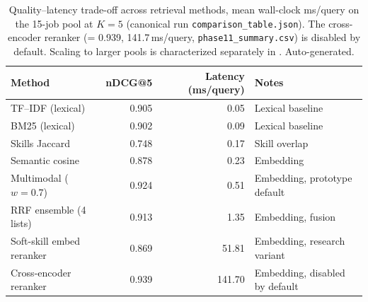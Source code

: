 \begin{table}[!t]
\centering
\caption{Quality--latency trade-off across retrieval methods, mean wall-clock ms/query on the 15-job pool at $K{=}5$ (canonical run \texttt{comparison\_table.json}). The cross-encoder reranker (\ndcg = 0.939, 141.7\,ms/query, \texttt{phase11\_summary.csv}) is disabled by default. Scaling to larger pools is characterized separately in . Auto-generated.}
\label{tab:latency}
\begin{tabular}{@{}lrrl@{}}
\toprule
Method & nDCG@5 & Latency (ms/query) & Notes \\
\midrule
TF--IDF (lexical) & 0.905 & 0.05 & Lexical baseline \\
BM25 (lexical) & 0.902 & 0.09 & Lexical baseline \\
Skills Jaccard & 0.748 & 0.17 & Skill overlap \\
Semantic cosine & 0.878 & 0.23 & Embedding \\
Multimodal ($w{=}0.7$) & 0.924 & 0.51 & Embedding, prototype default \\
RRF ensemble (4 lists) & 0.913 & 1.35 & Embedding, fusion \\
Soft-skill embed reranker & 0.869 & 51.81 & Embedding, research variant \\
Cross-encoder reranker & 0.939 & 141.70 & Embedding, disabled by default \\
\bottomrule
\end{tabular}
\end{table}
